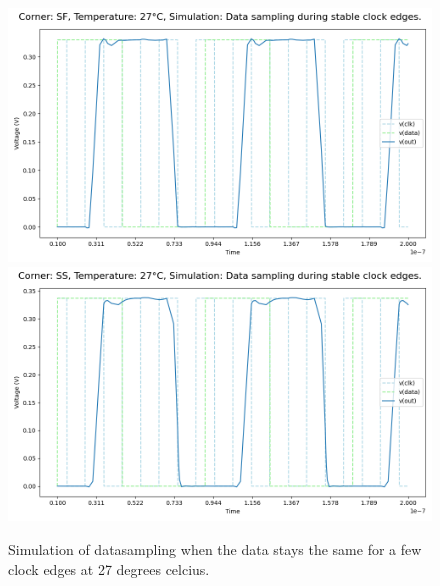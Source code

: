 \begin{figure}[H]
    \vspace{5pt}
    \includegraphics[height= 0.21\textheight]{figures/aimspice/SF/27/W2.csv.png}
    \vspace{5pt}
    \includegraphics[height= 0.21\textheight]{figures/aimspice/SS/27/W2.csv.png}
    \caption{Simulation of datasampling when the data stays the same for a few clock edges at 27 degrees celcius.}
    \label{fig:aimspice_W2_27}
\end{figure}

\pagebreak

